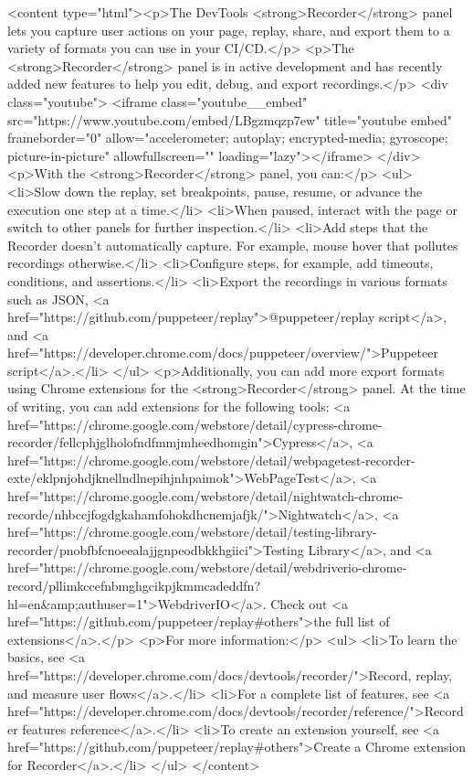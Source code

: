 <content type="html"><p>The DevTools <strong>Recorder</strong> panel lets you capture user actions on your page, replay, share, and export them to a variety of formats you can use in your CI/CD.</p> <p>The <strong>Recorder</strong> panel is in active development and has recently added new features to help you edit, debug, and export recordings.</p> <div class="youtube"> <iframe class="youtube__embed" src="https://www.youtube.com/embed/LBgzmqzp7ew" title="youtube embed" frameborder="0" allow="accelerometer; autoplay; encrypted-media; gyroscope; picture-in-picture" allowfullscreen="" loading="lazy"></iframe> </div> <p>With the <strong>Recorder</strong> panel, you can:</p> <ul> <li>Slow down the replay, set breakpoints, pause, resume, or advance the execution one step at a time.</li> <li>When paused, interact with the page or switch to other panels for further inspection.</li> <li>Add steps that the Recorder doesn't automatically capture. For example, mouse hover that pollutes recordings otherwise.</li> <li>Configure steps, for example, add timeouts, conditions, and assertions.</li> <li>Export the recordings in various formats such as JSON, <a href="https://github.com/puppeteer/replay">@puppeteer/replay script</a>, and <a href="https://developer.chrome.com/docs/puppeteer/overview/">Puppeteer script</a>.</li> </ul> <p>Additionally, you can add more export formats using Chrome extensions for the <strong>Recorder</strong> panel. At the time of writing, you can add extensions for the following tools: <a href="https://chrome.google.com/webstore/detail/cypress-chrome-recorder/fellcphjglholofndfmmjmheedhomgin">Cypress</a>, <a href="https://chrome.google.com/webstore/detail/webpagetest-recorder-exte/eklpnjohdjknellndlnepihjnhpaimok">WebPageTest</a>, <a href="https://chrome.google.com/webstore/detail/nightwatch-chrome-recorde/nhbccjfogdgkahamfohokdhcnemjafjk/">Nightwatch</a>, <a href="https://chrome.google.com/webstore/detail/testing-library-recorder/pnobfbfcnoeealajjgnpeodbkkhgiici">Testing Library</a>, and <a href="https://chrome.google.com/webstore/detail/webdriverio-chrome-record/pllimkccefnbmghgcikpjkmmcadeddfn?hl=en&amp;authuser=1">WebdriverIO</a>. Check out <a href="https://github.com/puppeteer/replay#others">the full list of extensions</a>.</p> <p>For more information:</p> <ul> <li>To learn the basics, see <a href="https://developer.chrome.com/docs/devtools/recorder/">Record, replay, and measure user flows</a>.</li> <li>For a complete list of features, see <a href="https://developer.chrome.com/docs/devtools/recorder/reference/">Recorder features reference</a>.</li> <li>To create an extension yourself, see <a href="https://github.com/puppeteer/replay#others">Create a Chrome extension for Recorder</a>.</li> </ul> </content>
